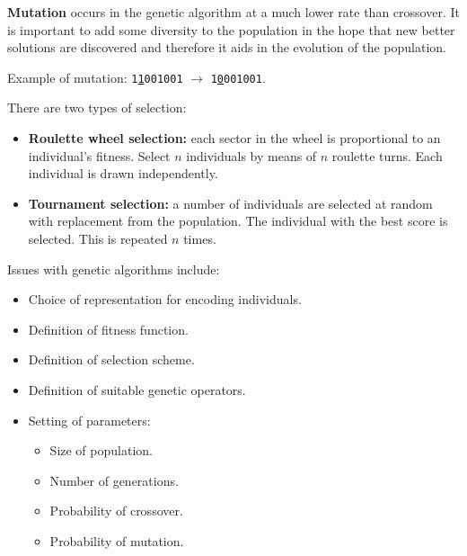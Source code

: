 \documentclass[a4paper,11pt]{article}
\begin{document}
\textbf{Mutation} occurs in the genetic algorithm at a much lower rate than crossover.
It is important to add some diversity to the population in the hope that new better solutions are discovered and therefore it aids in the evolution of the population.
\begin{tcolorbox}[colback=gray!10, colframe=black, title=\textbf{Mutation Example}]
Example  of mutation: \texttt{1\underline{1}001001} $\rightarrow$ \texttt{1\underline{0}001001}.
\end{tcolorbox}

There are two types of selection:
\begin{itemize}
    \item   \textbf{Roulette wheel selection:} each sector in the wheel is proportional to an individual's fitness.
            Select $n$ individuals by means of $n$ roulette turns.
            Each individual is drawn independently.
        \item   \textbf{Tournament selection:} a number of individuals are selected at random with replacement from the population.
                The individual with the best score is selected.
                This is repeated $n$ times.
\end{itemize}

Issues with genetic algorithms include:
\begin{itemize}
    \item   Choice of representation for encoding individuals.
    \item   Definition of fitness function.
    \item   Definition of selection scheme.
    \item   Definition of suitable genetic operators.
    \item   Setting of parameters:
            \begin{itemize}
                \item   Size of population.
                \item   Number of generations.
                \item   Probability of crossover.
                \item   Probability of mutation.
            \end{itemize}
\end{itemize}
\end{document}

